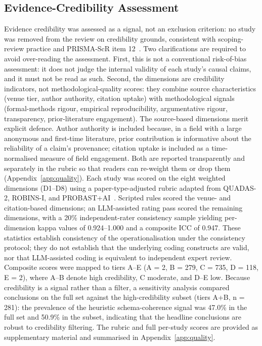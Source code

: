\subsection{Evidence-Credibility Assessment}
Evidence credibility was assessed as a signal, not an exclusion criterion: no study was removed from the review on credibility grounds, consistent with scoping-review practice and PRISMA-ScR item 12~\cite{tricco2018prismascr}. Two clarifications are required to avoid over-reading the assessment. First, this is not a conventional risk-of-bias assessment: it does not judge the internal validity of each study's causal claims, and it must not be read as such. Second, the dimensions are credibility indicators, not methodological-quality scores: they combine source characteristics (venue tier, author authority, citation uptake) with methodological signals (formal-methods rigour, empirical reproducibility, argumentative rigour, transparency, prior-literature engagement). The source-based dimensions merit explicit defence. Author authority is included because, in a field with a large anonymous and first-time literature, prior contribution is informative about the reliability of a claim's provenance; citation uptake is included as a time-normalised measure of field engagement. Both are reported transparently and separately in the rubric so that readers can re-weight them or drop them (Appendix~\ref{app:quality}). Each study was scored on the eight weighted dimensions (D1--D8) using a paper-type-adjusted rubric adapted from QUADAS-2, ROBINS-I, and PROBAST+AI~\cite{whiting2011quadas2,sterne2016robinsi,moons2025probastaialpha}. Scripted rules scored the venue- and citation-based dimensions; an LLM-assisted rating pass scored the remaining dimensions, with a 20\% independent-rater consistency sample yielding per-dimension kappa values of 0.924--1.000 and a composite ICC of 0.947. These statistics establish consistency of the operationalisation under the consistency protocol; they do not establish that the underlying coding constructs are valid, nor that LLM-assisted coding is equivalent to independent expert review. Composite scores were mapped to tiers A--E (A = 2, B = 279, C = 735, D = 118, E = 2), where A--B denote high credibility, C moderate, and D--E low. Because credibility is a signal rather than a filter, a sensitivity analysis compared conclusions on the full set against the high-credibility subset (tiers A+B, n = 281): the prevalence of the heuristic schema-coherence signal was 47.0\% in the full set and 50.9\% in the subset, indicating that the headline conclusions are robust to credibility filtering. The rubric and full per-study scores are provided as supplementary material and summarised in Appendix~\ref{app:quality}.

